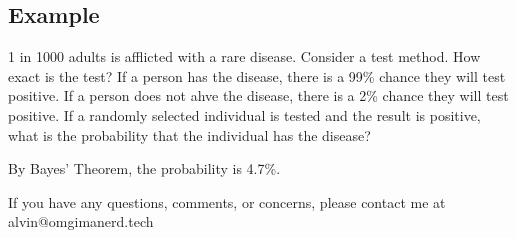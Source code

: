 \documentclass[letterpaper, 12pt]{math}
\begin{document}
\subsection*{Example}
1 in 1000 adults is afflicted with a rare disease. Consider a test method. How
exact is the test? If a person has the disease, there is a 99\% chance they will
test positive. If a person does not ahve the disease, there is a 2\% chance they
will test positive. If a randomly selected individual is tested and the result
is positive, what is the probability that the individual has the disease? \par
By Bayes' Theorem, the probability is 4.7\%.

\begin{center}
  If you have any questions, comments, or concerns, please contact me at
  alvin@omgimanerd.tech
\end{center}
\end{document}
